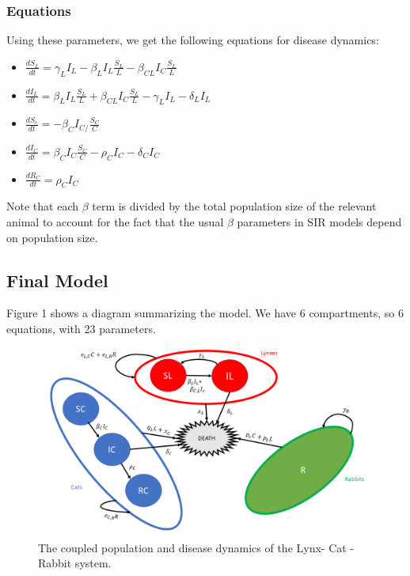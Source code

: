 \documentclass[12pt]{article}
\begin{document}
\subsubsection{Equations}
\quad Using these parameters, we get the following equations for disease dynamics:
\begin{itemize}
    \item $\frac{dS_{L}}{dt} = \gamma_{L}I_{L} - \beta_{L}I_{L}\frac{S_{L}}{L} - \beta_{CL}I_{C}\frac{S_{L}}{L}$
    \item $\frac{dI_{L}}{dt} = \beta_{L}I_{L}\frac{S_{L}}{L} + \beta_{CL}I_{C}\frac{S_{L}}{L} - \gamma_{L}I_{L} - \delta_{L}I_{L}$
    \item $\frac{dS_{c}}{dt} = -\beta_{C}I_{C/}\frac{S_{C}}{C}$
    \item $\frac{dI_{C}}{dt} = \beta_{C}I_{C}\frac{S_{C}}{C} - \rho_{C}I_{C} - \delta_{C}I_{C}$
    \item $\frac{dR_{C}}{dt} = \rho_{C}I_{C}$
\end{itemize}
\quad Note that each $\beta$ term is divided by the total population size of the relevant animal to account for the fact that the usual $\beta$ parameters in SIR models depend on population size.

\subsection{Final Model}

\quad Figure 1 shows a diagram summarizing the model. We have 6 compartments, so 6 equations, with 23 parameters.\\
\begin{figure}[!ht]
    \centering
    \includegraphics[width = \textwidth]{images/graph.png}
    \caption{The coupled population and disease dynamics of the Lynx- Cat - Rabbit system.}
    \label{fig:my_label}
\end{figure}
\end{document}
